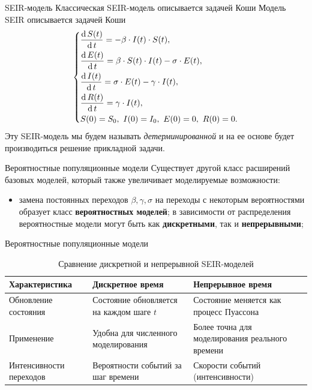 \documentclass[notheorems]{beamer}
\renewcommand{\d}{\operatorname{d}}
\begin{document}

\begin{frame}
	{SEIR-модель}
	Классическая SEIR-модель описывается задачей Коши
	Модель SEIR описывается задачей Коши
	\begin{equation*}
		\begin{dcases}
			\dfrac {\d S(t)}{\d t} = - \beta \cdot I(t)\cdot S(t),\\
			\dfrac {\d E(t)}{\d t} = \beta \cdot S(t)\cdot I(t) - \sigma\cdot E(t),\\
			\dfrac{\d I(t)}{\d t} =\sigma \cdot E(t) - \gamma\cdot I(t),\\
			\dfrac{\d R(t)}{\d t} = \gamma\cdot I(t),\\
			S(0) = S_0,\ I(0) = I_0,\ E(0) = 0,\ R(0) = 0.
		\end{dcases}
	\end{equation*}
	Эту SEIR-модель мы будем называть \textit{детерминированной} и на ее основе будет производиться решение прикладной задачи.
	
\end{frame}


\begin{frame}
	{Вероятностные популяционные модели}
	Существует другой класс расширений базовых моделей, который также увеличивает моделируемые возможности:
	\begin{itemize}
		\item замена постоянных переходов $\beta, \gamma, \sigma$ на переходы с некоторым вероятностями образует класс \textbf{вероятностных моделей}; в зависимости от распределения вероятностные модели могут быть как \textbf{дискретными}, так и \textbf{непрерывными};
	\end{itemize}
\end{frame}

\begin{frame}
	{Вероятностные популяционные модели}
			\begin{table}[h]
		\renewcommand{\arraystretch}{1}
		\caption{Сравнение дискретной и непрерывной SEIR-моделей}
		\begin{tabular}{|p{3cm}|p{3cm}|p{3cm}|}
			\hline
			\textbf{Характеристика} & \textbf{Дискретное время} & \textbf{Непрерывное время} \\ \hline
			Обновление состояния & Состояние обновляется на каждом шаге \( t \) & Состояние меняется как процесс Пуассона \\ \hline
			Применение & Удобна для численного моделирования & Более точна для моделирования реального времени \\ \hline
			Интенсивности переходов & Вероятности событий за шаг времени & Скорости событий (интенсивности) \\ \hline
		\end{tabular}
	\end{table}
\end{frame}
\end{document}
